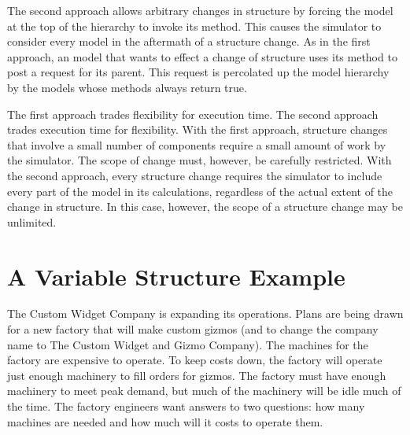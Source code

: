 The second approach allows arbitrary changes in structure by forcing the model at the top of the hierarchy to invoke its  method. This causes the simulator to consider every model in the aftermath of a structure change. As in the first approach, an  model that wants to effect a change of structure uses its  method to post a request for its parent. This request is percolated up the model hierarchy by the  models whose  methods always return true. 

The first approach trades flexibility for execution time. The second approach trades execution time for flexibility. With the first approach, structure changes that involve a small number of components require a small amount of work by the simulator. The scope of change must, however, be carefully restricted. With the second approach, every structure change requires the simulator to include every part of the model in its calculations, regardless of the actual extent of the change in structure. In this case, however, the scope of a structure change may be unlimited.

\section{A Variable Structure Example}
The Custom Widget Company is expanding its operations. Plans are being drawn for a new factory that will make custom gizmos (and to change the company name to The Custom Widget and Gizmo Company). The machines for the factory are expensive to operate. To keep costs down, the factory will operate just enough machinery to fill orders for gizmos. The factory must have enough machinery to meet peak demand, but much of the machinery will be idle much of the time. The factory engineers want answers to two questions: how many machines are needed and how much will it costs to operate them.

